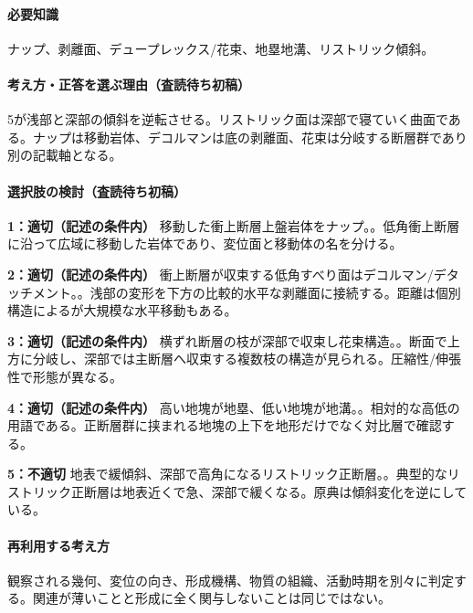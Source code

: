 \paragraph{必要知識} ナップ、剥離面、デュープレックス/花束、地塁地溝、リストリック傾斜。

\paragraph{考え方・正答を選ぶ理由（査読待ち初稿）} 5が浅部と深部の傾斜を逆転させる。リストリック面は深部で寝ていく曲面である。ナップは移動岩体、デコルマンは底の剥離面、花束は分岐する断層群であり別の記載軸となる。

\paragraph{選択肢の検討（査読待ち初稿）}\mbox{}\par

\noindent\textbf{1：適切（記述の条件内）} 移動した衝上断層上盤岩体をナップ。。低角衝上断層に沿って広域に移動した岩体であり、変位面と移動体の名を分ける。\par

\noindent\textbf{2：適切（記述の条件内）} 衝上断層が収束する低角すべり面はデコルマン/デタッチメント。。浅部の変形を下方の比較的水平な剥離面に接続する。距離は個別構造によるが大規模な水平移動もある。\par

\noindent\textbf{3：適切（記述の条件内）} 横ずれ断層の枝が深部で収束し花束構造。。断面で上方に分岐し、深部では主断層へ収束する複数枝の構造が見られる。圧縮性/伸張性で形態が異なる。\par

\noindent\textbf{4：適切（記述の条件内）} 高い地塊が地塁、低い地塊が地溝。。相対的な高低の用語である。正断層群に挟まれる地塊の上下を地形だけでなく対比層で確認する。\par

\noindent\textbf{5：不適切} 地表で緩傾斜、深部で高角になるリストリック正断層。。典型的なリストリック正断層は地表近くで急、深部で緩くなる。原典は傾斜変化を逆にしている。\par

\paragraph{再利用する考え方} 観察される幾何、変位の向き、形成機構、物質の組織、活動時期を別々に判定する。関連が薄いことと形成に全く関与しないことは同じではない。


